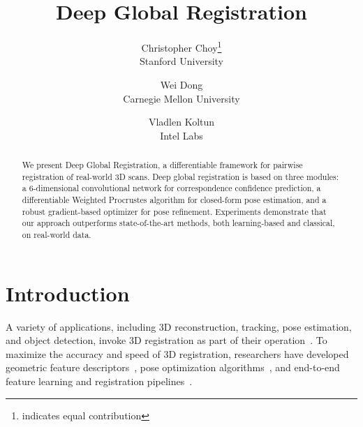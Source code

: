 \documentclass[10pt,twocolumn,letterpaper]{article}
\begin{document}
\title{Deep Global Registration}

\author{Christopher Choy\thanks{indicates equal contribution}\\
Stanford University\\
\and
Wei Dong\\
Carnegie Mellon University\\
\and
Vladlen Koltun\\
Intel Labs\\
}

\maketitle

\begin{abstract}
We present Deep Global Registration, a differentiable framework for pairwise registration of real-world 3D scans. Deep global registration is based on three modules: a 6-dimensional convolutional network for correspondence confidence prediction, a differentiable Weighted Procrustes algorithm for closed-form pose estimation, and a robust gradient-based  optimizer for pose refinement. Experiments demonstrate that our approach outperforms state-of-the-art methods, both learning-based and classical, on real-world data.
\end{abstract}

\section{Introduction}
\label{sec:intro}

A variety of applications, including 3D reconstruction, tracking, pose estimation, and object detection, invoke 3D registration as part of their operation~\cite{rusu2009icra, cai20103d, qian2014realtime}. To maximize the accuracy and speed of 3D registration, researchers have developed geometric feature descriptors~\cite{cgf, ppf_fold, wang2019deep, FCGF2019}, pose optimization algorithms~\cite{schnabel2007efficient, yang2015go, lucas1981iterative, zhou2016eccv}, and end-to-end feature learning and registration pipelines~\cite{wang2019deep, aoki2019pointnetlk}.
\end{document}
